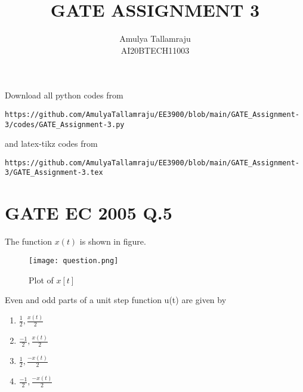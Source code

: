 \documentclass[journal,12pt,twocolumn]{IEEEtran}
\begin{document}
     \def\centbox#1{\makebox[0in]{#1}}
     \def\topbox#1{\raisebox{-\baselineskip}[0in][0in]{#1}}
     \def\midbox#1{\raisebox{-0.5\baselineskip}[0in][0in]{#1}}
\vspace{3cm}
\title{GATE ASSIGNMENT 3}
\author{Amulya Tallamraju \\ AI20BTECH11003}
\maketitle
\newpage
\bigskip
\renewcommand{\thefigure}{\theenumi}
\renewcommand{\thetable}{\theenumi}
Download all python codes from 
\begin{lstlisting}
https://github.com/AmulyaTallamraju/EE3900/blob/main/GATE_Assignment-3/codes/GATE_Assignment-3.py
\end{lstlisting}
%
and latex-tikz codes from 
%
\begin{lstlisting}
https://github.com/AmulyaTallamraju/EE3900/blob/main/GATE_Assignment-3/GATE_Assignment-3.tex
\end{lstlisting}
%
\section{GATE EC 2005 Q.5}
The function $x(t)$ is shown in figure.
\begin{figure}[!ht]
         \centering
         \texttt{[image: question.png]}
         \caption{Plot of $x[t]$}
         \label{plot1}
\end{figure}
 Even and odd parts of a unit step function u(t) are given by
 \begin{enumerate}
     \item $\frac{1}{2},\frac{x(t)}{2}$
          \item $\frac{-1}{2},\frac{x(t)}{2}$
               \item $\frac{1}{2},\frac{-x(t)}{2}$
                    \item $\frac{-1}{2},\frac{-x(t)}{2}$
 \end{enumerate}
\end{document}
